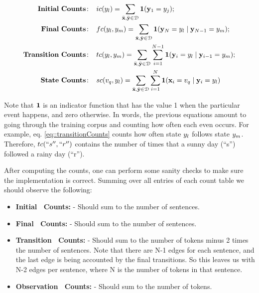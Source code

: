 \begin{align}
\mathbf{Initial \ Counts\!:}\;\;\;\;  &  ic(\hv_l) = \sum_{\trex} 
\Ind (\hs_1 = \hv_j); \label{eq::initialCounts}\\
%
\mathbf{Final \ Counts\!:}\;\;\;\;  &  fc(\hv_l,\hv _m) = \sum_{\trex} 
\Ind (\hs_N = \hv_l \mid \hs_{N-1} = \hv_m); \label{eq::finalCounts}\\
%
\mathbf{Transition \ Counts\!:}\;\;\;\;  &  tc(\hv_l,\hv _m) =
\sum_{\trex} \sum_{i = 1}^{N-1} \Ind (\hs_i = \hv_l \mid \hs_{i-1} = \hv_m); \label{eq::transitionCounts}\\
%
\mathbf{State \ Counts\!:}\;\;\;\;  &  sc(\vv_q,\hv_l) = \sum_{\trex} \sum_{i = 1}^{N}
\Ind (\obs_i = \vv_q\mid \hs_i = \hv_l) \label{eq::stateCounts}
\end{align}

Note that $\textbf{1}$ is an indicator function that has the value 1 when the
particular event happens, and zero otherwise. In words, the previous
equations amount to going through the training corpus and counting how
often each even occurs. For example, eq. \eqref{eq::transitionCounts} counts how often state ${y}_l$ follows state ${y}_m$. Therefore, $tc(``s'',``r'')$ contains the number of times that a sunny day (``s'') followed a rainy day (``r'').

%


After computing the counts, one can perform some sanity checks
to make sure the implementation is correct. Summing over all entries
of each count table we should observe the following:

\begin{itemize}
\item \textbf{Initial \ Counts\!:} - Should sum to the number of
  sentences.
\item \textbf{Final \ Counts\!:} - Should sum to the number of
  sentences.
\item \textbf{Transition \ Counts\!:} - Should sum to the number of
  tokens minus 2 times the number of sentences. Note that there are
  N-1 edges for each sentence, and the last edge is being accounted by
  the final transitions. So this leaves us with N-2 edges per sentence,
  where N is the number of tokens in that sentence.
\item \textbf{Observation \ Counts\!:} - Should sum to the number of tokens.
\end{itemize}


